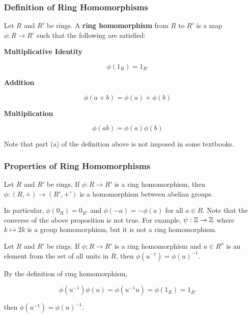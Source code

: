 \documentclass[a4paper,12pt]{article}
\begin{document}
\subsubsection{Definition of Ring Homomorphisms}
\begin{dft}
  Let $R$ and $R'$ be rings. A \textbf{ring homomorphism} from $R$ to $R'$ is a map $\phi:R\to R'$ such that the following are satisfied:

  \begin{alist}
    \item \textbf{Multiplicative Identity}

    $$\phi(1_{R})=1_{R'}$$

    \item \textbf{Addition}

    $$\phi(a+b)=\phi(a)+\phi(b)$$

    \item \textbf{Multiplication}

    $$\phi(ab)=\phi(a)\phi(b)$$
  \end{alist}
\end{dft}\n

Note that part (a) of the definition above is not imposed in some textbooks.

\subsubsection{Properties of Ring Homomorphisms}
\begin{pst}
  Let $R$ and $R'$ be rings. If $\phi:R\to R'$ is a ring homomorphism, then $\phi:(R,+)\to(R',+')$ is a homomorphism between abelian groups.
\end{pst}\n

In particular, $\phi(0_{R})=0_{R'}$ and $\phi(-a)=-\phi(a)$ for all $a\in R$. Note that the converse of the above proposition is not true. For example, $\psi:\mathbb{Z}\to\mathbb{Z}$ where $k\mapsto 2k$ is a group homomorphism, but it is not a ring homomorphism.\n

\begin{pst}
  Let $R$ and $R'$ be rings. If $\phi:R\to R'$ is a ring homomorphism and $u\in R^{x}$ is an element from the set of all units in $R$, then $\phi(u^{-1})=\phi(u)^{-1}$.\n

  \prf By the definition of ring homomorphism,

  $$\phi(u^{-1})\phi(u)=\phi(u^{-1}u)=\phi(1_{R})=1_{R'}$$\s

  then $\phi(u^{-1})=\phi(u)^{-1}$.
\end{pst}
\end{document}
